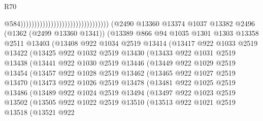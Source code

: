 \begin{lexlean}{R70}
\begin{coremodule}
                                                                      @584))))))))))))))))))))))))))))))))
      (@2490
        @13360
        @13374
        @1037
        @13382
        @2496
        (@1362 (@2499 @13360 @1341))
        (@13389
          @866
          @94
          @1035
          @1301
          @1303
          @13358
          @2511
          @13403
          (@13408
            @922
            @1034
            @2519
            @13414
            (@13417
              @922
              @1033
              @2519
              @13422
              (@13425
                @922
                @1032
                @2519
                @13430
                (@13433
                  @922
                  @1031
                  @2519
                  @13438
                  (@13441
                    @922
                    @1030
                    @2519
                    @13446
                    (@13449
                      @922
                      @1029
                      @2519
                      @13454
                      (@13457
                        @922
                        @1028
                        @2519
                        @13462
                        (@13465
                          @922
                          @1027
                          @2519
                          @13470
                          (@13473
                            @922
                            @1026
                            @2519
                            @13478
                            (@13481
                              @922
                              @1025
                              @2519
                              @13486
                              (@13489
                                @922
                                @1024
                                @2519
                                @13494
                                (@13497
                                  @922
                                  @1023
                                  @2519
                                  @13502
                                  (@13505
                                    @922
                                    @1022
                                    @2519
                                    @13510
                                    (@13513
                                      @922
                                      @1021
                                      @2519
                                      @13518
                                      (@13521
                                        @922

\end{coremodule}
\end{lexlean}
